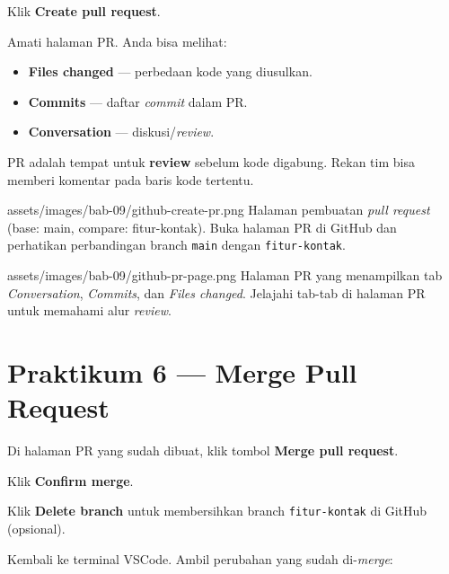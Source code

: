 \begin{langkah}
  \item Klik \textbf{Create pull request}.
  \item Amati halaman PR. Anda bisa melihat:
\end{langkah}

\begin{itemize}
  \item \textbf{Files changed} --- perbedaan kode yang diusulkan.
  \item \textbf{Commits} --- daftar \emph{commit} dalam PR.
  \item \textbf{Conversation} --- diskusi/\emph{review}.
\end{itemize}

\begin{tip}
PR adalah tempat untuk \textbf{review} sebelum kode digabung. Rekan tim bisa memberi komentar pada baris kode tertentu.
\end{tip}

\begin{tangkapanlayar}
  {assets/images/bab-09/github-create-pr.png}
  {Halaman pembuatan \emph{pull request} (base: main, compare: fitur-kontak).}
  {Buka halaman PR di GitHub dan perhatikan perbandingan branch \texttt{main} dengan \texttt{fitur-kontak}.}
\end{tangkapanlayar}

\begin{tangkapanlayar}
  {assets/images/bab-09/github-pr-page.png}
  {Halaman PR yang menampilkan tab \emph{Conversation}, \emph{Commits}, dan \emph{Files changed}.}
  {Jelajahi tab-tab di halaman PR untuk memahami alur \emph{review}.}
\end{tangkapanlayar}

\section{Praktikum 6 --- Merge Pull Request}
\label{sec:praktik-merge-pr}

\begin{langkah}
  \item Di halaman PR yang sudah dibuat, klik tombol \textbf{Merge pull request}.
  \item Klik \textbf{Confirm merge}.
  \item Klik \textbf{Delete branch} untuk membersihkan branch \texttt{fitur-kontak} di GitHub (opsional).
  \item Kembali ke terminal VSCode. Ambil perubahan yang sudah di-\emph{merge}:
\end{langkah}

